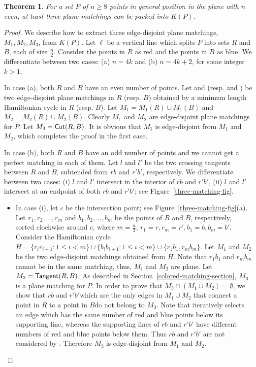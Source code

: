 \documentclass[11pt,a4paper]{article}
\newcommand{\M}[2]{\text{$M_{#1}(#2)$}}
\newcommand{\Cut}[2]{\text{\sf Cut$(#1,#2)$}}
\newcommand{\Tangent}[2]{\text{\sf Tangent$(#1,#2)$}}
\newcommand{\Kn}[1]{K#1}
\newtheorem{theorem}{Theorem}
\begin{document}
\begin{theorem}
\label{3-matching-theorem}
For a set $P$ of $n\ge 8$ points in general position in the plane with $n$ even, at least three plane matchings can be packed into $\Kn{(P)}$.
\end{theorem}
\begin{proof}
We describe how to extract three edge-disjoint plane matchings, $M_1,M_2,M_3$, from $\Kn{(P)}$. Let $\ell$ be a vertical line which splits $P$ into sets $R$ and $B$, each of size $\frac{n}{2}$. Consider the points in $R$ as red and the points in $B$ as blue. We differentiate between two cases: (a) $n=4k$ and (b) $n= 4k+2$, for some integer $k>1$.

In case (a), both $R$ and $B$ have an even number of points. Let \M{1}{R} and \M{2}{R} (resp. \M{1}{B} and \M{2}{B}) be two edge-disjoint plane matchings in $R$ (resp. $B$) obtained by a minimum length Hamiltonian cycle in $R$ (resp. $B$). Let $M_1=\M{1}{R}\cup \M{1}{B}$ and $M_2=\M{2}{R}\cup \M{2}{B}$. Clearly $M_1$ and $M_2$ are edge-disjoint plane matchings for $P$. Let $M_3=\Cut{R}{B}$. It is obvious that $M_3$ is edge-disjoint from $M_1$ and $M_2$, which completes the proof in the first case.

In case (b), both $R$ and $B$ have an odd number of points and we cannot get a perfect matching in each of them. Let $l$ and $l'$ be the two crossing tangents between $R$ and $B$, subtended from $rb$ and $r'b'$, respectively. We differentiate between two cases: (i) $l$ and $l'$ intersect in the interior of $rb$ and $r'b'$, (ii) $l$ and $l'$ intersect at an endpoint of both $rb$ and $r'b'$; see Figure~\ref{three-matching-fig}.
\begin{itemize}
\item In case (i), let $c$ be the intersection point; see Figure~\ref{three-matching-fig}(a). Let $r_1, r_2, \dots, r_m$ and $b_1, b_2, \allowbreak\dots, \allowbreak b_m$ be the points of $R$ and $B$, respectively, sorted clockwise around $c$, where $m=\frac{n}{2}$, $r_1=r,r_m=r', b_1=b, b_m=b'$. Consider the Hamiltonian cycle $H=\{r_ir_{i+1}:1\le i< m\}\cup \{b_ib_{i+1}:1\le i< m\}\cup \{r_1b_1,r_mb_m\}$. Let $M_1$ and $M_2$ be the two edge-disjoint matchings obtained from $H$. Note that $r_1b_1$ and $r_mb_m$ cannot be in the same matching, thus, $M_1$ and $M_2$ are plane. Let $M_3=\Tangent{R}{B}$. As described in Section~\ref{colored-matching-section}, $M_3$ is a plane matching for $P$. In order to prove that $M_3\cap (M_1\cup M_2)=\emptyset$, we show that $rb$ and $r'b'$\textemdash which are the only edges in $M_1\cup M_2$ that connect a point in $R$ to a point in $B$\textemdash do not belong to $M_3$. Note that \Tangent{R}{B} iteratively selects an edge which has the same number of red and blue points below its supporting line, whereas the supporting lines of $rb$ and $r'b'$ have different numbers of red and blue points below them. Thus $rb$ and $r'b'$ are not considered by \Tangent{R}{B}. Therefore $M_3$ is edge-disjoint from $M_1$ and $M_2$. 


\end{itemize}
\end{proof}
\end{document}
